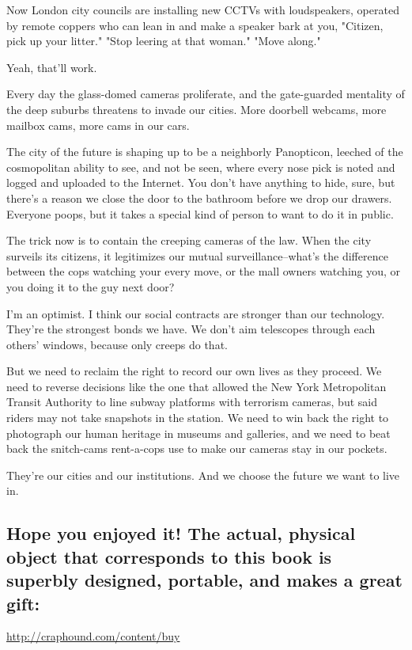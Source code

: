 Now London city councils are installing new CCTVs with
loudspeakers, operated by remote coppers who can lean in and make a
speaker bark at you, "Citizen, pick up your litter." "Stop leering
at that woman." "Move along."

Yeah, that'll work.

Every day the glass-domed cameras proliferate, and the gate-guarded
mentality of the deep suburbs threatens to invade our cities. More
doorbell webcams, more mailbox cams, more cams in our cars.

The city of the future is shaping up to be a neighborly Panopticon,
leeched of the cosmopolitan ability to see, and not be seen, where
every nose pick is noted and logged and uploaded to the Internet.
You don't have anything to hide, sure, but there's a reason we
close the door to the bathroom before we drop our drawers. Everyone
poops, but it takes a special kind of person to want to do it in
public.

The trick now is to contain the creeping cameras of the law. When
the city surveils its citizens, it legitimizes our mutual
surveillance--what's the difference between the cops watching your
every move, or the mall owners watching you, or you doing it to the
guy next door?

I'm an optimist. I think our social contracts are stronger than our
technology. They're the strongest bonds we have. We don't aim
telescopes through each others' windows, because only creeps do
that.

But we need to reclaim the right to record our own lives as they
proceed. We need to reverse decisions like the one that allowed the
New York Metropolitan Transit Authority to line subway platforms
with terrorism cameras, but said riders may not take snapshots in
the station. We need to win back the right to photograph our human
heritage in museums and galleries, and we need to beat back the
snitch-cams rent-a-cops use to make our cameras stay in our
pockets.

They're our cities and our institutions. And we choose the future
we want to live in.

\subsection{Hope you enjoyed it! The actual, physical object that corresponds to this book is superbly designed, portable, and makes a great gift:}

\href{http://craphound.com/content/buy}{http://craphound.com/content/buy}

